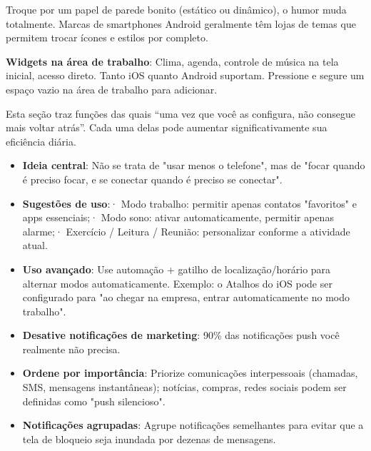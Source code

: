 Troque por um papel de parede bonito (estático ou dinâmico), o humor muda totalmente. Marcas de smartphones Android geralmente têm lojas de temas que permitem trocar ícones e estilos por completo.

\textbf{Widgets na área de trabalho}: Clima, agenda, controle de música na tela inicial, acesso direto. Tanto iOS quanto Android suportam. Pressione e segure um espaço vazio na área de trabalho para adicionar.


Esta seção traz funções das quais “uma vez que você as configura, não consegue mais voltar atrás”. Cada uma delas pode aumentar significativamente sua eficiência diária.


\begin{itemize}
  \item \textbf{Ideia central}: Não se trata de "usar menos o telefone", mas de "focar quando é preciso focar, e se conectar quando é preciso se conectar".
  \item \textbf{Sugestões de uso}:\newline · Modo trabalho: permitir apenas contatos "favoritos" e apps essenciais;\newline · Modo sono: ativar automaticamente, permitir apenas alarme;\newline · Exercício / Leitura / Reunião: personalizar conforme a atividade atual.
  \item \textbf{Uso avançado}: Use automação + gatilho de localização/horário para alternar modos automaticamente. Exemplo: o Atalhos do iOS pode ser configurado para "ao chegar na empresa, entrar automaticamente no modo trabalho".
\end{itemize}


\begin{itemize}
  \item \textbf{Desative notificações de marketing}: 90\% das notificações push você realmente não precisa.
  \item \textbf{Ordene por importância}: Priorize comunicações interpessoais (chamadas, SMS, mensagens instantâneas); notícias, compras, redes sociais podem ser definidas como "push silencioso".
  \item \textbf{Notificações agrupadas}: Agrupe notificações semelhantes para evitar que a tela de bloqueio seja inundada por dezenas de mensagens.
\end{itemize}

